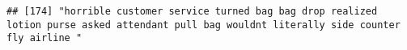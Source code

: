 \documentclass[
]{article}
\begin{document}
\begin{verbatim}
## [174] "horrible customer service turned bag bag drop realized lotion purse asked attendant pull bag wouldnt literally side counter fly airline "                                                                                                                                                                                                                                                                                                                                                                                                                                                                                                                                                                                                                                                                                                                                                                                                                                                                                                                                                                                                                                                                                                                                                                                                                                                                                                                                                                                                                                                                                                                                                                                                                                                      

\end{verbatim}
\end{document}
